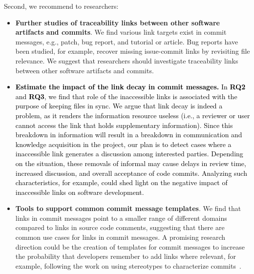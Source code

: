\documentclass[smallextended]{svjour3}       %
\newcommand{\fix}[1]{\textcolor{black}{#1}}
\newcommand{\minor}[1]{\textcolor{black}{#1}}
\begin{document}


Second, we recommend to researchers: 
\begin{itemize}



\item \textbf{\textsf{Further studies of traceability links between other software artifacts and commits}}. We find various link targets exist in commit messages, e.g., patch, bug report, and tutorial or article. Bug reports have been studied, for example, \cite{sun2017frlink} recover missing issue-commit links by revisiting file relevance. We suggest that researchers should investigate traceability links between other software artifacts and commits.

\item \textbf{\textsf{\fix{Estimate the impact of the link decay in commit messages.}}} \fix{In \textbf{RQ2} and \textbf{RQ3}, we find that role of the \minor{inaccessible} links is associated with the purpose of keeping files in sync. We argue that link decay is indeed a problem, as it renders the information resource useless (i.e., a reviewer or user cannot access the link that holds supplementary information). Since this breakdown in information will result in a breakdown in communication and knowledge acquisition in the project, our plan is to detect cases where a \minor{inaccessible} link generates a discussion among interested parties. Depending on the situation, these removals of informal may cause delays in review time, increased discussion, and overall acceptance of code commits. Analyzing such characteristics, for example, could shed light on the negative impact of \minor{inaccessible} links on software development.}

\item \textbf{\textsf{Tools to support common commit message templates}}. We find that links in commit messages point to a smaller range of different domains compared to links in source code comments, suggesting that there are common use cases for links in commit messages. A promising research direction could be the creation of templates for commit messages to increase the probability that developers remember to add links where relevant, for example, following the work on using stereotypes to characterize commits~\citep{dragan2011using}.




\end{itemize}
\end{document}
